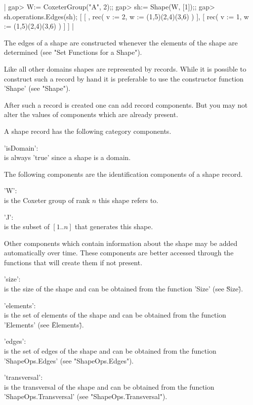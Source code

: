 |    gap> W:= CoxeterGroup("A", 2);;
    gap> sh:= Shape(W, [1]);;
    gap> sh.operations.Edges(sh);  
    [ [ , rec(
              v := 2,
              w := (1,5)(2,4)(3,6) ) ], [ rec(
              v := 1,
              w := (1,5)(2,4)(3,6) ) ] ] |
              
The edges of  a shape are constructed whenever the  elements of the shape
are determined (see "Set Functions for a Shape").


Like all  other domains shapes are  represented by records.   While it is
possible to construct  such a record by hand it is  preferable to use the
constructor function 'Shape' (see "Shape").

After such  a record is  created one can add  record components.  But you
may not alter the values of components which are already present.

A shape record has the following category components.

'isDomain': \\
        is always 'true' since a shape is a domain.
        
The  following components are  the identification  components of  a shape
record.

'W': \\
        is the Coxeter group of rank $n$ this shape refers to.

'J': \\
        is the subset of $[1..n]$ that generates this shape.
        
Other components which  contain information about the shape  may be added
automatically over  time.  These  components are better  accessed through
the functions that will create them if not present.

'size': \\
        is the  size of the shape  and can be obtained  from the function
        'Size' (see \"Size\").

'elements': \\
        is the set of elements of  the shape and can be obtained from the
        function 'Elements' (see \"Elements\").

'edges': \\
        is the  set of edges  of the shape  and can be obtained  from the
        function 'ShapeOps.Edges' (see "ShapeOps.Edges").

'transversal': \\
        is  the transversal of  the shape  and can  be obtained  from the
        function 'ShapeOps.Transversal' (see "ShapeOps.Transversal").

